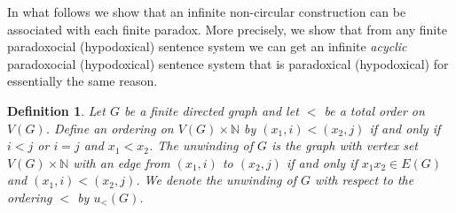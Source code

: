 \documentclass[12pt]{kluwer}
\newtheorem{defn}{Definition}
\theoremstyle{remark}
\begin{document}
In what follows we show that an infinite non-circular construction can be associated with each finite paradox. More precisely, we show that from any finite paradoxocial (hypodoxical) sentence system we can get an infinite \textit{acyclic} paradoxocial (hypodoxical) sentence system that is paradoxical (hypodoxical) for essentially the same reason.

\begin{defn}
Let $G$ be a finite directed graph and let $<$ be a total order on $V(G)$.  Define an ordering on $V(G) \times \mathbb{N}$ by $(x_1, i) < (x_2, j)$ if and only if $i < j$ or $i = j$ and $x_1 < x_2$. The \emph{unwinding} of $G$ is the graph with vertex set $V(G) \times \mathbb{N}$ with an edge from $(x_1, i)$ to $(x_2, j)$ if and only if $x_1x_2 \in E(G)$ and $(x_1, i) < (x_2, j)$.  We denote the unwinding of $G$ with respect to the ordering $<$ by $u_{<}(G)$.
\end{defn}
\end{document}
